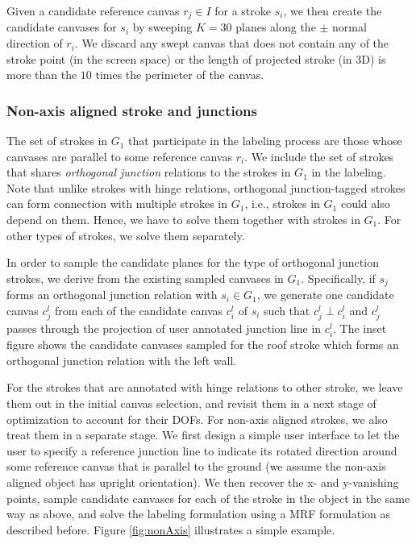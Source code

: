 {Given a candidate reference canvas $r_j \in I$ for a stroke $s_i$, we then create the candidate canvases for $s_i$ by sweeping $K = 30$ planes along the $\pm$ normal direction of ${r_i}$. We discard any swept canvas that does not contain any of the stroke point (in the screen space) or the length of projected stroke (in 3{D}) is more than the $10$ times the perimeter of the canvas.

\subsubsection{Non-axis aligned stroke and junctions}

The set of strokes in $G_1$ that participate in the labeling process are those
whose canvases are parallel to some reference canvas $r_i$. We include the set of strokes that shares \emph{orthogonal junction} relations to the strokes in $G_1$ in the labeling. Note that unlike strokes with hinge relations, orthogonal junction-tagged strokes can form connection with multiple strokes in $G_1$, i.e., strokes in $G_1$ could also depend on them. Hence, we have to solve them together with strokes in $G_1$. For other types of strokes, we solve them separately.

In order to sample the candidate planes for the type of orthogonal junction strokes, we derive from the existing sampled canvases in $G_1$. Specifically, if $s_j$ forms an orthogonal junction relation with $s_i \in G_1$, we generate one candidate canvas $c_j^l$ from each of the candidate canvas $c_i^l$ of $s_i$ such that $c_j^l \perp c_i^l$ and $c_j^l$ passes through the projection of user annotated junction line in $c_i^l$. The inset figure shows the candidate canvases sampled for the roof stroke which forms an orthogonal junction relation with the left wall.

For the strokes that are annotated with hinge relations to other stroke, we leave them out in the initial canvas selection, and revisit them in a next stage of optimization to account for their DOFs. For non-axis aligned strokes, we also treat them in a separate stage. We first design a simple user interface to let the user to specify a reference junction line to indicate its rotated direction around some reference canvas that is parallel to the ground (we assume the non-axis aligned object has upright orientation). We then recover the x- and y-vanishing points, sample candidate canvases for each of the stroke in the object in the same way as above, and solve the labeling formulation using a MRF formulation as described before. Figure \ref{fig:nonAxis} illustrates a simple example.

}

